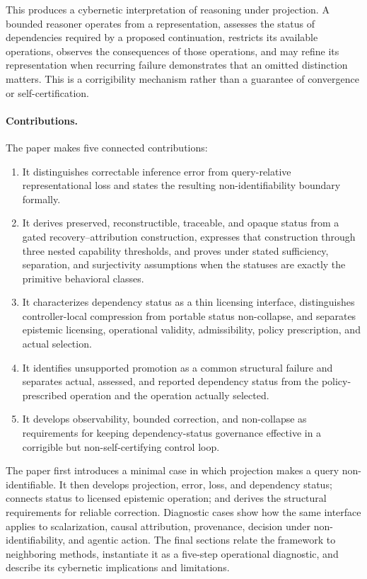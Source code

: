 \documentclass[11pt]{article}
\theoremstyle{definition}
\theoremstyle{remark}
\begin{document}
This produces a cybernetic interpretation of reasoning under projection. A bounded reasoner operates from a representation, assesses the status of dependencies required by a proposed continuation, restricts its available operations, observes the consequences of those operations, and may refine its representation when recurring failure demonstrates that an omitted distinction matters. This is a corrigibility mechanism rather than a guarantee of convergence or self-certification.

\paragraph{Contributions.}
The paper makes five connected contributions:

\begin{enumerate}[leftmargin=1.5em]
    \item It distinguishes correctable inference error from query-relative representational loss and states the resulting non-identifiability boundary formally.
    \item It derives preserved, reconstructible, traceable, and opaque status from a gated recovery--attribution construction, expresses that construction through three nested capability thresholds, and proves under stated sufficiency, separation, and surjectivity assumptions when the statuses are exactly the primitive behavioral classes.
    \item It characterizes dependency status as a thin licensing interface, distinguishes controller-local compression from portable status non-collapse, and separates epistemic licensing, operational validity, admissibility, policy prescription, and actual selection.
    \item It identifies unsupported promotion as a common structural failure and separates actual, assessed, and reported dependency status from the policy-prescribed operation and the operation actually selected.
    \item It develops observability, bounded correction, and non-collapse as requirements for keeping dependency-status governance effective in a corrigible but non-self-certifying control loop.
\end{enumerate}

The paper first introduces a minimal case in which projection makes a query non-identifiable. It then develops projection, error, loss, and dependency status; connects status to licensed epistemic operation; and derives the structural requirements for reliable correction. Diagnostic cases show how the same interface applies to scalarization, causal attribution, provenance, decision under non-identifiability, and agentic action. The final sections relate the framework to neighboring methods, instantiate it as a five-step operational diagnostic, and describe its cybernetic implications and limitations.
\end{document}
